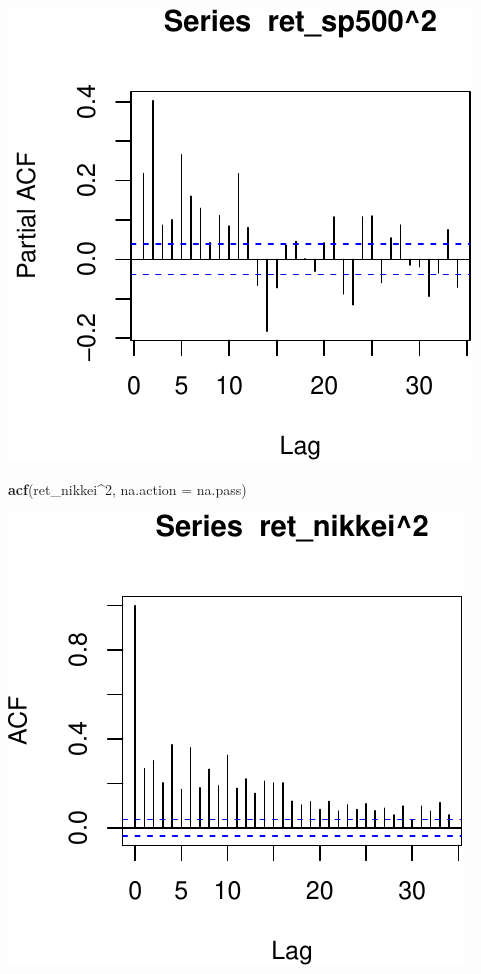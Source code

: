 \documentclass[11pt,]{article}
\newenvironment{Shaded}{\begin{snugshade}}{\end{snugshade}}
\newcommand{\KeywordTok}[1]{\textcolor[rgb]{0.13,0.29,0.53}{\textbf{#1}}}
\newcommand{\DataTypeTok}[1]{\textcolor[rgb]{0.13,0.29,0.53}{#1}}
\newcommand{\DecValTok}[1]{\textcolor[rgb]{0.00,0.00,0.81}{#1}}
\newcommand{\OperatorTok}[1]{\textcolor[rgb]{0.81,0.36,0.00}{\textbf{#1}}}
\newcommand{\NormalTok}[1]{#1}
\begin{document}
\begin{center}\includegraphics{FMC_T4_PhD_ARMA_GARCH_files/figure-latex/ret_ind_ACF_sq-2} \end{center}

\begin{Shaded}
\begin{Highlighting}[]
\KeywordTok{acf}\NormalTok{(ret_nikkei}\OperatorTok{^}\DecValTok{2}\NormalTok{, }\DataTypeTok{na.action =}\NormalTok{ na.pass)}
\end{Highlighting}
\end{Shaded}

\begin{center}\includegraphics{FMC_T4_PhD_ARMA_GARCH_files/figure-latex/ret_ind_ACF_sq-3} \end{center}
\end{document}
